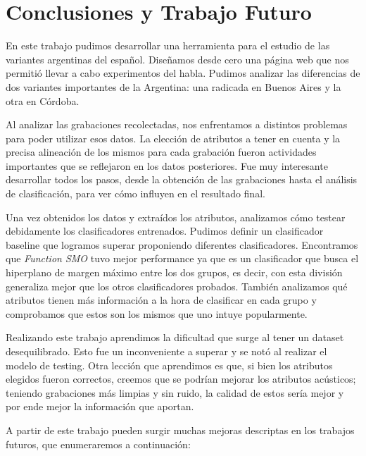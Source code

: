 \chapter{Conclusiones y Trabajo Futuro}

En este trabajo pudimos desarrollar una herramienta para el estudio de las variantes argentinas del español. Diseñamos desde cero una página web que nos permitió llevar a cabo experimentos del habla. Pudimos analizar las diferencias de dos variantes importantes de la Argentina: una radicada en Buenos Aires y la otra en Córdoba. 

Al analizar las grabaciones recolectadas, nos enfrentamos a distintos problemas para poder utilizar esos datos. La elección de atributos a tener en cuenta y la precisa alineación de los mismos para cada grabación fueron actividades importantes que se reflejaron en los datos posteriores. Fue muy interesante desarrollar todos los pasos, desde la obtención de las grabaciones hasta el análisis de clasificación, para ver cómo influyen en el resultado final.

Una vez obtenidos los datos y extraídos los atributos, analizamos cómo testear debidamente los clasificadores entrenados. Pudimos definir un clasificador baseline que logramos superar proponiendo diferentes clasificadores. Encontramos que \textit{Function SMO} tuvo mejor performance ya que es un clasificador que busca el hiperplano de margen máximo entre los dos grupos, es decir, con esta división generaliza mejor que los otros clasificadores probados. También analizamos qué atributos tienen más información a la hora de clasificar en cada grupo y comprobamos que estos son los mismos que uno intuye popularmente.

Realizando este trabajo aprendimos la dificultad que surge al tener un dataset desequilibrado. Esto fue un inconveniente a superar y se notó al realizar el modelo de testing. Otra lección que aprendimos es que, si bien los atributos elegidos fueron correctos, creemos que se podrían mejorar los atributos acústicos; teniendo grabaciones más limpias y sin ruido, la calidad de estos sería mejor y por ende mejor la información que aportan. 

A partir de este trabajo pueden surgir muchas mejoras descriptas en los trabajos futuros, que enumeraremos a continuación:

